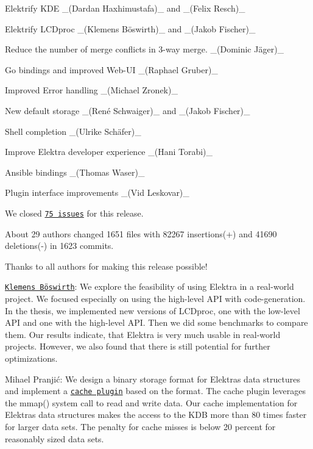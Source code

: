 \begin{DoxyItemize}
\item Elektrify K\+DE \+\_\+(\+Dardan Haxhimustafa)\+\_\+ and \+\_\+(\+Felix Resch)\+\_\+
\item Elektrify L\+C\+Dproc \+\_\+(Klemens Böswirth)\+\_\+ and \+\_\+(\+Jakob Fischer)\+\_\+
\item Reduce the number of merge conflicts in 3-\/way merge. \+\_\+(Dominic Jäger)\+\_\+
\item Go bindings and improved Web-\/\+UI \+\_\+(\+Raphael Gruber)\+\_\+
\item Improved Error handling \+\_\+(\+Michael Zronek)\+\_\+
\item New default storage \+\_\+(René Schwaiger)\+\_\+ and \+\_\+(\+Jakob Fischer)\+\_\+
\item Shell completion \+\_\+(Ulrike Schäfer)\+\_\+
\item Improve Elektra developer experience \+\_\+(\+Hani Torabi)\+\_\+
\item Ansible bindings \+\_\+(\+Thomas Waser)\+\_\+
\item Plugin interface improvements \+\_\+(\+Vid Leskovar)\+\_\+
\end{DoxyItemize}

We closed \href{https://github.com/ElektraInitiative/libelektra/milestone/21?closed=1}{\tt 75 issues} for this release.

About 29 authors changed 1651 files with 82267 insertions(+) and 41690 deletions(-\/) in 1623 commits.

Thanks to all authors for making this release possible!


\begin{DoxyItemize}
\item \href{https://www.libelektra.org/ftp/elektra/publications/boeswirth2019highlevel.pdf}{\tt Klemens Böswirth}\+: We explore the feasibility of using Elektra in a real-\/world project. We focused especially on using the high-\/level A\+PI with code-\/generation. In the thesis, we implemented new versions of L\+C\+Dproc, one with the low-\/level A\+PI and one with the high-\/level A\+PI. Then we did some benchmarks to compare them. Our results indicate, that Elektra is very much usable in real-\/world projects. However, we also found that there is still potential for further optimizations.
\item Mihael Pranjić\+: We design a binary storage format for Elektra\textquotesingle{}s data structures and implement a \href{https://www.libelektra.org/plugins/cache}{\tt cache plugin} based on the format. The cache plugin leverages the {\ttfamily mmap()} system call to read and write data. Our cache implementation for Elektra\textquotesingle{}s data structures makes the access to the K\+DB more than 80 times faster for larger data sets. The penalty for cache misses is below 20 percent for reasonably sized data sets.
\end{DoxyItemize}

